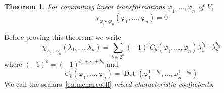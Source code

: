 \documentclass[letterpaper]{article}
\DeclareMathOperator{\Det}{Det}
\newcommand{\sign}[1]{(-1)^{#1}}
\theoremstyle{definition}
\theoremstyle{plain}
\newtheorem{thm}{Theorem}
\begin{document}
\begin{thm}
For commuting linear transformations \(\varphi_1,\ldots,\varphi_n\) of~\(V\),
\begin{equation}
\chi_{\varphi_1\cdots\varphi_n}(\varphi_1,\ldots,\varphi_n)=0\label{eq:mch}
\end{equation}
\end{thm}
\noindent Before proving this theorem, we write
\begin{equation}
\chi_{\varphi_1\cdots\varphi_n}(\lambda_1,\ldots,\lambda_n)=\sum_{b\in 2^n}\sign{b}C_b(\varphi_1,\ldots,\varphi_n)\lambda_1^{b_1}\cdots\lambda_n^{b_n}\label{eq:mcharpolye}
\end{equation}
where \(\sign{b}=(-1)^{b_1+\cdots+b_n}\) and
\begin{equation}
C_b(\varphi_1,\ldots,\varphi_n)=\Det(\varphi_1^{1-b_1},\ldots,\varphi_n^{1-b_n})\label{eq:mcharcoeff}
\end{equation}
We call the scalars~\eqref{eq:mcharcoeff} \emph{mixed characteristic coefficients}.
\end{document}
